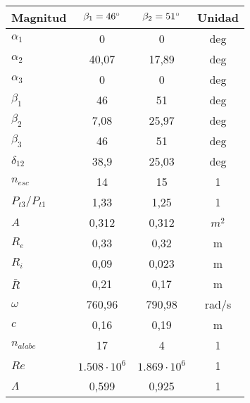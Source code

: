 \documentclass{report}
\begin{document}
\begin{center}
\begin{tabular}{l | c | c | c}
Magnitud & $\beta_1 = 46\degree$ & $\beta_2 = 51\degree$ & Unidad\\
\hline
$\alpha_1$ & 0 & 0 & deg \\
$\alpha_2$ & 40,07 & 17,89 & deg \\
$\alpha_3$ & 0 & 0 & deg \\
$\beta_1$ & 46 & 51 & deg \\
$\beta_2$ & 7,08 & 25,97 & deg \\
$\beta_3$ & 46 & 51 & deg \\
$\delta_{12}$ & 38,9 & 25,03 & deg \\
$n_{esc}$ & 14 & 15 & 1 \\
$P_{t3}/P_{t1}$ & 1,33 & 1,25 & 1 \\
$A$ & 0,312 & 0,312 & $m^2$ \\
$R_e$ & 0,33 & 0,32 & m \\
$R_i$ & 0,09 & 0,023 & m \\
$\bar{R}$& 0,21 & 0,17 & m \\
$\omega$ & 760,96 & 790,98 & rad/s \\
$c$ & 0,16 & 0,19 & m \\
$n_{alabe}$ & 17 & 4 & 1 \\
$Re$ & $1.508 \cdot 10^6$ & $1.869 \cdot 10^6$ & 1 \\
$\Lambda$ & 0,599 & 0,925 & 1 \\
\end{tabular}
\end{center}
\end{document}
